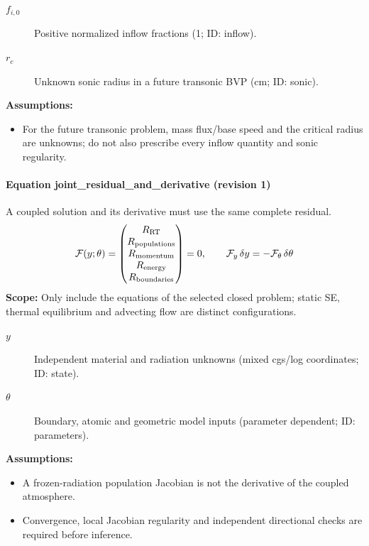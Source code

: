 \begin{description}
\item[$f_{i,0}$] Positive normalized inflow fractions (1; ID: inflow).
\item[$r_c$] Unknown sonic radius in a future transonic BVP (cm; ID: sonic).
\end{description}

\noindent\textbf{Assumptions:}
\begin{itemize}
\item For the future transonic problem, mass flux/base speed and the critical radius are unknowns; do not also prescribe every inflow quantity and sonic regularity.
\end{itemize}

\paragraph{Equation joint\_residual\_and\_derivative (revision 1)}
A coupled solution and its derivative must use the same complete residual.
\begin{equation}
\begin{aligned}
\mathcal F(y;\theta)=\begin{pmatrix}R_{\rm RT}\\R_{\rm populations}\\R_{\rm momentum}\\R_{\rm energy}\\R_{\rm boundaries}\end{pmatrix}=0,\qquad \mathcal F_y\,\delta y=-\mathcal F_\theta\,\delta\theta
\end{aligned}
\label{eq:escape.coupled_5f_hydrogen:joint_5f_residual_5f_and_5f_derivative:1}
\end{equation}
\noindent\textbf{Scope:} Only include the equations of the selected closed problem; static SE, thermal equilibrium and advecting flow are distinct configurations.

\begin{description}
\item[$y$] Independent material and radiation unknowns (mixed cgs/log coordinates; ID: state).
\item[$\theta$] Boundary, atomic and geometric model inputs (parameter dependent; ID: parameters).
\end{description}

\noindent\textbf{Assumptions:}
\begin{itemize}
\item A frozen-radiation population Jacobian is not the derivative of the coupled atmosphere.
\item Convergence, local Jacobian regularity and independent directional checks are required before inference.
\end{itemize}

